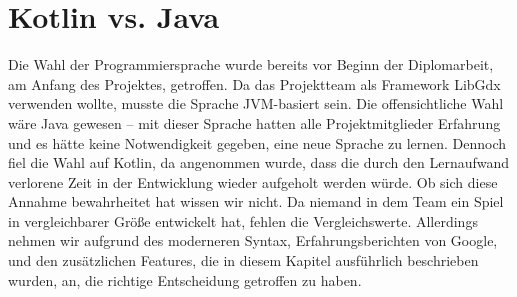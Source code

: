
\section{Kotlin vs. Java}\label{sec:kotlin-vs-java}

\renewcommand{\kapitelautor}{Autor: Marvin Kurka}

Die Wahl der Programmiersprache wurde bereits vor Beginn der Diplomarbeit, am Anfang des Projektes, getroffen.
Da das Projektteam als Framework LibGdx verwenden wollte, musste die Sprache JVM-basiert sein.
Die offensichtliche Wahl wäre Java gewesen -- mit dieser Sprache hatten alle Projektmitglieder Erfahrung und es hätte
keine Notwendigkeit gegeben, eine neue Sprache zu lernen.
Dennoch fiel die Wahl auf Kotlin, da angenommen wurde, dass die durch den Lernaufwand verlorene Zeit in der Entwicklung
wieder aufgeholt werden würde.
Ob sich diese Annahme bewahrheitet hat wissen wir nicht.
Da niemand in dem Team ein Spiel in vergleichbarer Größe entwickelt hat, fehlen die Vergleichswerte.
Allerdings nehmen wir aufgrund des moderneren Syntax, Erfahrungsberichten von \zB Google, und den zusätzlichen Features,
die in diesem Kapitel ausführlich beschrieben wurden, an, die richtige Entscheidung getroffen zu haben.

\renewcommand{\kapitelautor}{}
